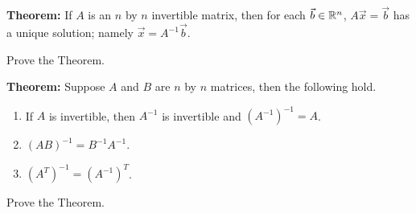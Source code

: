 \documentclass[12pt,letterpaper]{article}
\begin{document}
\begin{enumerate}
{\bf Theorem:} If $A$ is an $n$ by $n$ invertible matrix, then for each $\vec{b}\in \mathbb{R}^n$, $A\vec{x}=\vec{b}$ has a unique solution; namely $\vec{x}=A^{-1}\vec{b}$.

\Problem Prove the Theorem.

\vfill

\newpage

{\bf Theorem:} Suppose $A$ and $B$ are $n$ by $n$ matrices, then the following hold. 
\begin{enumerate}
\item If $A$ is invertible, then $A^{-1}$ is invertible and $(A^{-1})^{-1}=A$.
\item $(AB)^{-1}=B^{-1} A^{-1}$.
\item $(A^{T})^{-1}=(A^{-1})^{T}$.
\end{enumerate}

\Problem Prove the Theorem.

 

\end{enumerate}
\end{document}
